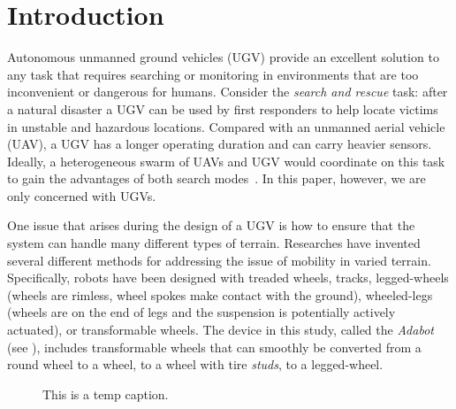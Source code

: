\section{Introduction}

Autonomous unmanned ground vehicles (UGV) provide an excellent solution to any task that requires searching or monitoring in environments that are too inconvenient or dangerous for humans.
%
Consider the \emph{search and rescue}  task: after a natural disaster a UGV can be used by first responders to help locate victims in unstable and hazardous locations.
%
Compared with an unmanned aerial vehicle (UAV), a UGV has a longer operating duration and can carry heavier sensors.
%
Ideally, a heterogeneous swarm of UAVs and UGV would coordinate on this task to gain the advantages of both search modes~\autocite{Kruijff.SearchAndRescue.ICFSR.2014}.
%
In this paper, however, we are only concerned with UGVs.


One issue that arises during the design of a UGV is how to ensure that the system can handle many different types of terrain.
%
Researches have invented several different methods for addressing the issue of mobility in varied terrain.
%
Specifically, robots have been designed with treaded wheels, tracks, legged-wheels (wheels are rimless, wheel spokes make contact with the ground), wheeled-legs (wheels are on the end of legs and the suspension is potentially actively actuated), or transformable wheels.
%
The device in this study, called the \emph{Adabot} (see ), includes transformable wheels that can smoothly be converted from a round wheel to a wheel, to a wheel with tire \emph{studs}, to a legged-wheel.






\begin{figure}[!ht]
    \centering

    \fbox{\crule[white]{\columnwidth}{2cm}}

    \caption{This is a temp caption.}
    \label{fig:adabot}
\end{figure}
